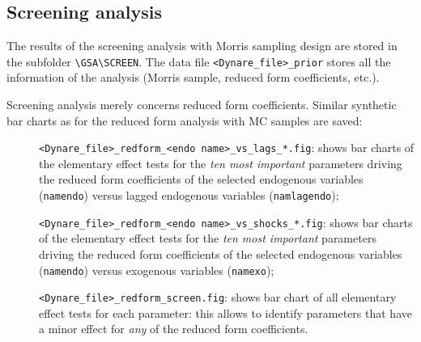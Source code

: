 \documentclass[12pt,a4paper]{article}
\begin{document}
\subsection{Screening analysis}
The results of the screening analysis with Morris sampling design
are stored in the subfolder \verb"\GSA\SCREEN". The data file
\verb"<Dynare_file>_prior" stores all the information of the
analysis (Morris sample, reduced form coefficients, etc.).

Screening analysis merely concerns reduced form coefficients.
Similar synthetic bar charts as for the reduced form analysis with
MC samples are saved:
\begin{description}
\item[]\verb"<Dynare_file>_redform_<endo name>_vs_lags_*.fig":
shows bar charts of the elementary effect tests for the \emph{ten
most important} parameters driving the reduced form coefficients
of the selected endogenous variables (\verb"namendo") versus
lagged endogenous variables (\verb"namlagendo");
\item[]\verb"<Dynare_file>_redform_<endo name>_vs_shocks_*.fig":
shows bar charts of the elementary effect tests for the \emph{ten
most important} parameters driving the reduced form coefficients
of the selected endogenous variables (\verb"namendo") versus
exogenous variables (\verb"namexo");
\item[]\verb"<Dynare_file>_redform_screen.fig": shows bar chart of
all elementary effect tests for each  parameter: this allows to
identify parameters that have a minor effect for \emph{any} of the
reduced form coefficients.
\end{description}



%
%


\newpage
\end{document}
